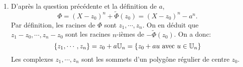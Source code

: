 \begin{enumerate}
\item  D'apr\`{e}s la question pr\'{e}c\'{e}dente et la définition de $a$,
\[
\Phi = (X-z_{0})^{n} +\widetilde{\Phi }(z_{0}) = (X-z_{0})^{n} - a^n.  
\]
Par d\'{e}finition, les racines de $\Phi $ sont  $z_{1},\cdots ,z_{n}$. On en déduit que $z_{1}-z_{0},\cdots ,z_{n}-z_{0}$ sont les racines $n$-i\`{e}mes de $-\widetilde{\Phi }(z_{0})$. On a donc: 
\[
\left\lbrace  z_1, \cdots , z_n \right\rbrace 
= z_0 + a \mathbb{U}_n = \left\lbrace z_0 + au \text{ avec } u\in \mathbb{U}_n\right\rbrace 
\]
Les complexes $z_{1},\cdots ,z_{n}$ sont les sommets d'un polyg\^{o}ne r\'{e}gulier de centre $z_{0}$.
\end{enumerate}

